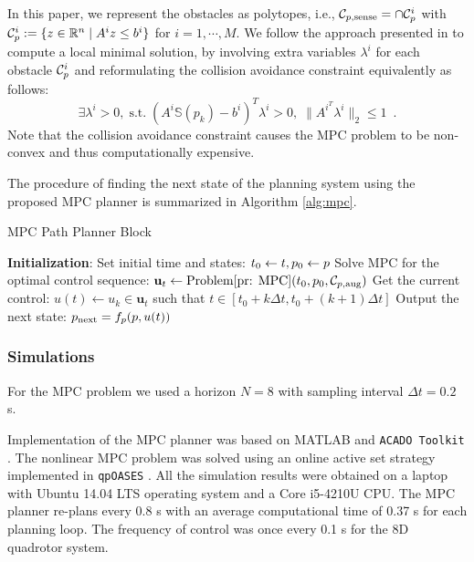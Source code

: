 In this paper, we represent the obstacles as polytopes, i.e., $\mathcal C_{p,\text{sense}} = \cap \mathcal C_p^{i}$ with $\mathcal C_p^{i}:= \{z\in\mathbb{R}^{n} \mid A^{i}z\leq b^{i}\}$ for $i = 1,\cdots ,M$. We follow the approach presented in \cite{Zhang2017} to compute a local minimal solution, by involving extra variables $\lambda^{i}$ for each obstacle $\mathcal C_p^{i}$ and reformulating the collision avoidance constraint equivalently as follows: 
%
\begin{equation}
\exists \lambda^{i} >0, \; \mbox{s.t.} \; (A^{i} \mathbb{S}(p_k) - b^{i})^{T}\lambda^{i}  > 0, \; \|A^{i^{T}}\lambda^{i}\|_2\leq 1\enspace .
\end{equation}
%
Note that the collision avoidance constraint causes the MPC problem to be non-convex and thus computationally expensive.

The procedure of finding the next state of the planning system using the proposed MPC planner is summarized in Algorithm \ref{alg:mpc}.
%
\begin{algorithm}	
	\caption{MPC Path Planner Block}
	\label{alg:mpc}
	\begin{algorithmic}[1]
		\STATE \textbf{Initialization}:
 		\STATE Set initial time and states: $t_0 \leftarrow t, p_0 \leftarrow p$
			\STATE Solve MPC for the optimal control sequence: $\mathbf{u}_t \leftarrow \text{Problem\ref{pr: MPC}} (t_0,p_0,\mathcal C_{p,\text{aug}})$
		\ENDIF
        \STATE Get the current control: $u(t) \leftarrow u_k \in \mathbf{u}_t$ such that $t \in [t_0 + k \Delta t, t_0 + (k+1) \Delta t]$
		\STATE Output the next state: $p_\text{next} = f_p(p,u(t))$
	\end{algorithmic}
\end{algorithm}

\subsubsection{Simulations}






For the MPC problem we used a horizon $N=8$ with sampling interval $\Delta t = 0.2$ s.

Implementation of the MPC planner was based on MATLAB and \texttt{ACADO Toolkit} \cite{Houska2011a}. The nonlinear MPC problem was solved using an online active set strategy implemented in \texttt{qpOASES} \cite{Ferreau2014}. All the simulation results were obtained on a laptop with Ubuntu 14.04 LTS operating system and a Core i5-4210U CPU. The MPC planner re-plans every 0.8 s with an average computational time of 0.37 s for each planning loop. The frequency of control was once every 0.1 s for the 8D quadrotor system.

